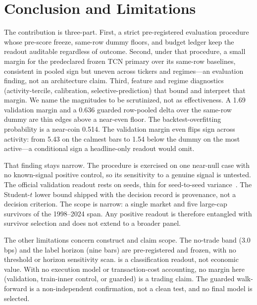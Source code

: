 \section{Conclusion and Limitations}
\label{sec:limitations}

The contribution is three-part. First, a strict pre-registered evaluation
procedure whose pre-score freeze, same-row dummy floors, and budget ledger keep
the readout auditable regardless of outcome. Second, under that procedure, a
small margin for the predeclared frozen TCN primary over its
same-row baselines, consistent in pooled sign but uneven across tickers and regimes---an evaluation finding, not an architecture claim. Third,
feature and regime diagnostics (activity-tercile, calibration,
selective-prediction) that bound and interpret that margin. We name the
magnitudes to be scrutinized, not as effectiveness. A 1.69\pp{} validation
margin and a 0.636\pp{} guarded row-pooled delta over the same-row dummy are thin
edges above a near-even floor. The backtest-overfitting probability is a
near-coin 0.514. The validation margin even flips sign across activity: from
5.43\pp{} on the calmest bars to 1.54\pp{} below the dummy on the most active---a
conditional sign a headline-only readout would omit.

That finding stays narrow. The procedure is exercised on one near-null case with
no known-signal positive control, so its sensitivity to a genuine signal is
untested. The official validation readout rests
on \numseeds{} seeds, thin for
seed-to-seed variance~\cite{bouthillier2021accounting,picard2021torch}. The
Student-$t$ lower bound shipped with the decision record is provenance, not a
decision criterion. The scope is narrow: a single market and five large-cap
survivors of the 1998--2024 span. Any positive readout is therefore entangled with
survivor selection and does not extend to a broader panel.

The other limitations concern construct and claim scope. The no-trade band
($3.0$ bps) and the label horizon (nine bars) are pre-registered and frozen, with
no threshold or horizon sensitivity scan. \macrofone{} is a classification
readout, not economic value. With no execution model or transaction-cost
accounting, no margin here (validation, train-inner control, or guarded) is a
trading claim. The guarded walk-forward is a non-independent confirmation, not a
clean test, and no final model is selected.

